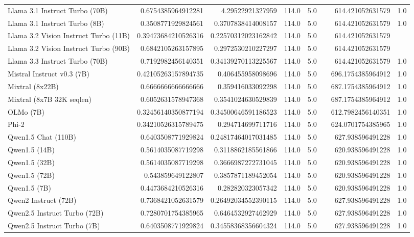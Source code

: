 \begin{table}[htp]
{\begin{tabular}{lrrrrrrr}
Llama 3.1 Instruct Turbo (70B) & 0.6754385964912281 & 4.29522921327959 & 114.0 & 5.0 &  & 614.421052631579 & 1.0 \\
Llama 3.1 Instruct Turbo (8B) & 0.3508771929824561 & 0.3707838414008157 & 114.0 & 5.0 &  & 614.421052631579 & 1.0 \\
Llama 3.2 Vision Instruct Turbo (11B) & 0.39473684210526316 & 0.22570312023162842 & 114.0 & 5.0 &  & 614.421052631579 &  \\
Llama 3.2 Vision Instruct Turbo (90B) & 0.6842105263157895 & 0.2972530210227297 & 114.0 & 5.0 &  & 614.421052631579 &  \\
Llama 3.3 Instruct Turbo (70B) & 0.7192982456140351 & 0.34139270113225567 & 114.0 & 5.0 &  & 614.421052631579 & 1.0 \\
Mistral Instruct v0.3 (7B) & 0.42105263157894735 & 0.406455958098696 & 114.0 & 5.0 &  & 696.1754385964912 & 1.0 \\
Mixtral (8x22B) & 0.6666666666666666 & 0.359416033092298 & 114.0 & 5.0 &  & 687.1754385964912 & 1.0 \\
Mixtral (8x7B 32K seqlen) & 0.6052631578947368 & 0.3541024630529839 & 114.0 & 5.0 &  & 687.1754385964912 & 1.0 \\
OLMo (7B) & 0.32456140350877194 & 0.34500646591186523 & 114.0 & 5.0 &  & 612.7982456140351 & 1.0 \\
Phi-2 & 0.34210526315789475 & 0.294714699711716 & 114.0 & 5.0 &  & 624.0701754385965 & 1.0 \\
Qwen1.5 Chat (110B) & 0.6403508771929824 & 0.24817464017031485 & 114.0 & 5.0 &  & 627.938596491228 & 1.0 \\
Qwen1.5 (14B) & 0.5614035087719298 & 0.3118862185561866 & 114.0 & 5.0 &  & 620.938596491228 & 1.0 \\
Qwen1.5 (32B) & 0.5614035087719298 & 0.3666987272731045 & 114.0 & 5.0 &  & 620.938596491228 & 1.0 \\
Qwen1.5 (72B) & 0.543859649122807 & 0.3857871189452054 & 114.0 & 5.0 &  & 620.938596491228 & 1.0 \\
Qwen1.5 (7B) & 0.4473684210526316 & 0.282820323057342 & 114.0 & 5.0 &  & 620.938596491228 & 1.0 \\
Qwen2 Instruct (72B) & 0.7368421052631579 & 0.26492034552390115 & 114.0 & 5.0 &  & 627.938596491228 & 1.0 \\
Qwen2.5 Instruct Turbo (72B) & 0.7280701754385965 & 0.6464532927462929 & 114.0 & 5.0 &  & 627.938596491228 & 1.0 \\
Qwen2.5 Instruct Turbo (7B) & 0.6403508771929824 & 0.34558368356604324 & 114.0 & 5.0 &  & 627.938596491228 & 1.0 \\

\end{tabular}}
\end{table}
